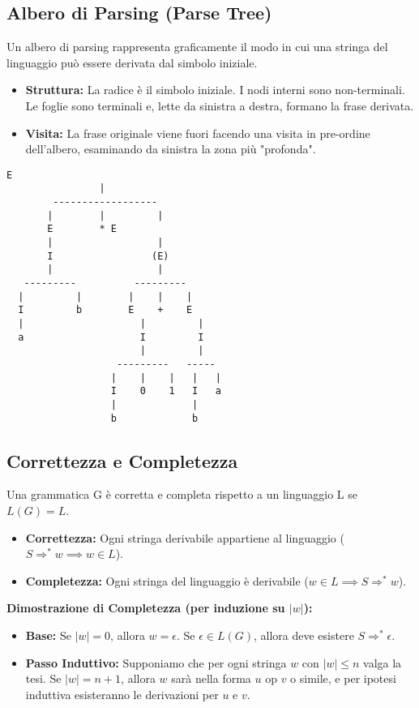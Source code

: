 \subsection{Albero di Parsing (Parse Tree)}
Un albero di parsing rappresenta graficamente il modo in cui una stringa del linguaggio
può essere derivata dal simbolo iniziale.
\begin{itemize}
    \item \textbf{Struttura:} La radice è il simbolo iniziale. I nodi interni sono non-terminali. Le foglie sono terminali e, lette da sinistra a destra, formano la frase derivata.
    \item \textbf{Visita:} La frase originale viene fuori facendo una visita in pre-ordine dell'albero, esaminando da sinistra la zona più "profonda".
\end{itemize}
\vspace{0.3 cm}
\begin{Verbatim}[frame=single, label=Albero di Parsing per ab*(b01+ba)]
                E
                |
        ------------------
       |        |         |
       E        * E
       |                  |
       I                 (E)
       |                  |
   ---------          ---------
  |         |        |    |    |
  I         b        E    +    E
  |                    |         |
  a                    I         I
                       |         |
                   ---------   -----
                  |    |    |   |   |
                  I    0    1   I   a
                  |             |
                  b             b
\end{Verbatim}


\subsection{Correttezza e Completezza}
Una grammatica G è corretta e completa rispetto a un linguaggio L se $L(G) = L$.
\begin{itemize}
    \item \textbf{Correttezza:} Ogni stringa derivabile appartiene al linguaggio ($S \Rightarrow^* w \implies w \in L$).
    \item \textbf{Completezza:} Ogni stringa del linguaggio è derivabile ($w \in L \implies S \Rightarrow^* w$).
\end{itemize}

\vspace{0.2 cm}
\textbf{Dimostrazione di Completezza (per induzione su $|w|$):}
\begin{itemize}
    \item \textbf{Base:} Se $|w|=0$, allora $w=\epsilon$. Se $\epsilon \in L(G)$, allora deve esistere $S \Rightarrow^* \epsilon$.
    \item \textbf{Passo Induttivo:} Supponiamo che per ogni stringa $w$ con $|w| \le n$ valga la tesi. Se $|w|=n+1$, allora $w$ sarà nella forma $u \text{ op } v$ o simile, e per ipotesi induttiva esisteranno le derivazioni per $u$ e $v$.
\end{itemize}

